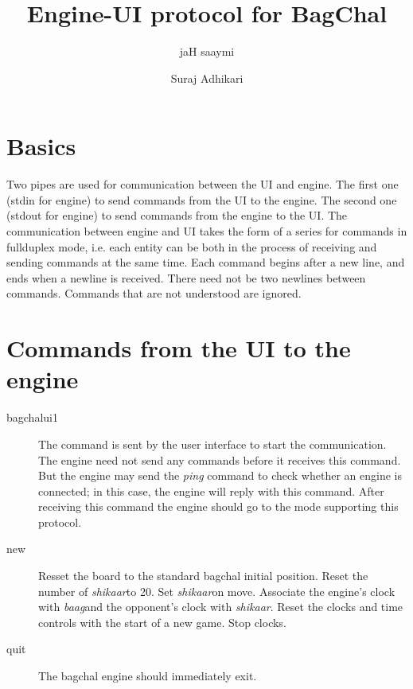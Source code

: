 \documentclass{article}
\newcommand{\cmdr}[1]{{\em #1}}
\newcommand{\baag}{{\em baag}}
\newcommand{\shikaar}{{\em shikaar}}
\begin{document}
\title{Engine-UI protocol for BagChal}
\author{jaH saaymi \and Suraj Adhikari}
\maketitle

\section{Basics}

Two pipes are used for communication between the UI and engine. The
first one (stdin for engine) to send commands from the UI to the
engine. The second one (stdout for engine) to send commands from the
engine to the UI. The communication between engine and UI takes the
form of a series for commands in fullduplex mode, i.e. each entity can
be both in the process of receiving and sending commands at the same
time. Each command begins after a new line, and ends when a newline is
received. There need not be two newlines between commands. Commands
that are not understood are ignored.

\section{Commands from the UI to the engine}

\begin{description}
\item[bagchalui1]{The command is sent by the user interface to start
the communication. The engine need not send any commands before it
receives this command. But the engine may send the \cmdr{ping} command
to check whether an engine is connected; in this case, the engine will
reply with this command. After receiving this command the engine
should go to the mode supporting this protocol.}

\item[new]{Resset the board to the standard bagchal initial
position. Reset the number of \shikaar to 20. Set \shikaar on
move. Associate the engine's clock with \baag and the opponent's clock
with \shikaar. Reset the clocks and time controls with the start of a
new game. Stop clocks.}

\item[quit]{The bagchal engine should immediately exit.}

\end{description}
\end{document}
